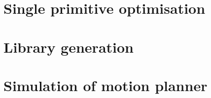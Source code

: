 \section{Single primitive optimisation}


\section{Library generation}


\section{Simulation of motion planner}

